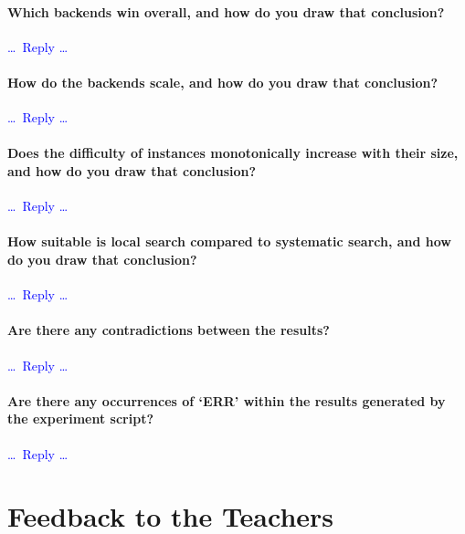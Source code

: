 \documentclass[a4paper,11pt,hidelinks]{article}
\renewcommand{\todo}[1]{\textcolor{blue}{#1}} %
\begin{document}
\paragraph{Which backends win overall, and how do you draw that conclusion?}
\todo{\dots\ Reply \dots}

\paragraph{How do the backends scale, and how do you draw that conclusion?}
\todo{\dots\ Reply \dots}

\paragraph{Does the difficulty of instances monotonically increase
  with their size, and how do you draw that conclusion?}
\todo{\dots\ Reply \dots}

\paragraph{How suitable is local search compared to systematic search,
  and how do you draw that conclusion?}
\todo{\dots\ Reply \dots}

\paragraph{Are there any contradictions between the results?}
\todo{\dots\ Reply \dots}

\paragraph{Are there any occurrences of `ERR' within the results generated
  by the experiment script?}
\todo{\dots\ Reply \dots}



\bigskip
\section*{Feedback to the Teachers}
\end{document}
